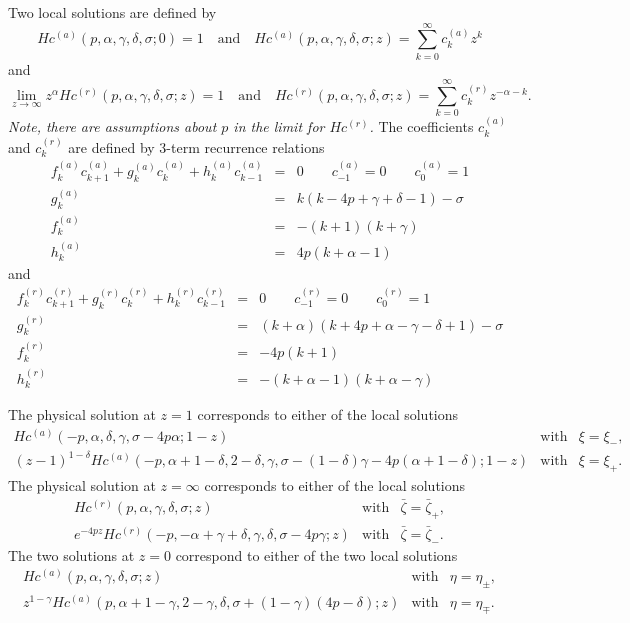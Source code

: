 \documentclass[11pt]{article}
\begin{document}
Two local solutions are defined by
\begin{equation}
 Hc^{(a)}(p,\alpha,\gamma,\delta,\sigma;0)=1 \quad\mbox{and}\quad
 Hc^{(a)}(p,\alpha,\gamma,\delta,\sigma;z) = \sum_{k=0}^\infty{c^{(a)}_kz^k}
\end{equation}
and
\begin{equation}
 \lim_{z\to\infty}z^\alpha Hc^{(r)}(p,\alpha,\gamma,\delta,\sigma;z)=1
 \quad\mbox{and}\quad
 Hc^{(r)}(p,\alpha,\gamma,\delta,\sigma;z) = \sum_{k=0}^\infty{c^{(r)}_kz^{-\alpha-k}}.
\end{equation}
{\em Note, there are assumptions about $p$ in the limit for
  $Hc^{(r)}$.}  The coefficients $c^{(a)}_k$ and $c^{(r)}_k$ are
defined by 3-term recurrence relations
\begin{eqnarray}
  f^{(a)}_kc^{(a)}_{k+1}+ g^{(a)}_kc^{(a)}_k+ h^{(a)}_kc^{(a)}_{k-1} &=& 0 
  \qquad c^{(a)}_{-1}=0 \qquad c^{(a)}_0=1 \\
  g^{(a)}_k &=& k(k-4p+\gamma+\delta-1)-\sigma \\
  f^{(a)}_k &=& -(k+1)(k+\gamma) \\
  h^{(a)}_k &=& 4p(k+\alpha-1)
\end{eqnarray}
and
\begin{eqnarray}
  f^{(r)}_kc^{(r)}_{k+1}+ g^{(r)}_kc^{(r)}_k+ h^{(r)}_kc^{(r)}_{k-1} &=& 0 
  \qquad c^{(r)}_{-1}=0 \qquad c^{(r)}_0=1 \\
  g^{(r)}_k &=& (k+\alpha)(k+4p+\alpha-\gamma-\delta+1)-\sigma \\
  f^{(r)}_k &=& -4p(k+1) \\
  h^{(r)}_k &=& -(k+\alpha-1)(k+\alpha-\gamma)
\end{eqnarray}

The physical solution at $z=1$ corresponds to either of the local solutions
\begin{eqnarray}\label{eq:local_sol_z1a}
  Hc^{(a)}(-p,\alpha,\delta,\gamma,\sigma-4p\alpha;1-z) &\mbox{with}&
  \xi=\xi_\minus, \\\label{eq:local_sol_z1b}
  (z-1)^{1-\delta}Hc^{(a)}(-p,\alpha+1-\delta,2-\delta,\gamma,\sigma-(1-\delta)\gamma-4p(\alpha+1-\delta);1-z) &\mbox{with}&
  \xi=\xi_+.
\end{eqnarray}
The physical solution at $z=\infty$ corresponds to either of the local solutions
\begin{eqnarray}\label{eq:local_sol_zinfa}
  Hc^{(r)}(p,\alpha,\gamma,\delta,\sigma;z) &\mbox{with}&
  \bar\zeta=\bar\zeta_+, \\\label{eq:local_sol_zinfb}
  e^{-4pz}Hc^{(r)}(-p,-\alpha+\gamma+\delta,\gamma,\delta,\sigma-4p\gamma;z) &\mbox{with}&
  \bar\zeta=\bar\zeta_\minus.
\end{eqnarray}
The two solutions at $z=0$ correspond to either of the two local solutions
\begin{eqnarray}\label{eq:local_sol_z0a}
  Hc^{(a)}(p,\alpha,\gamma,\delta,\sigma;z) &\mbox{with}&
  \eta=\eta_\pm, \\\label{eq:local_sol_z0b}
  z^{1-\gamma}Hc^{(a)}(p,\alpha+1-\gamma,2-\gamma,\delta,\sigma+(1-\gamma)(4p-\delta);z) &\mbox{with}&
  \eta=\eta_\mp.
\end{eqnarray}
\end{document}
